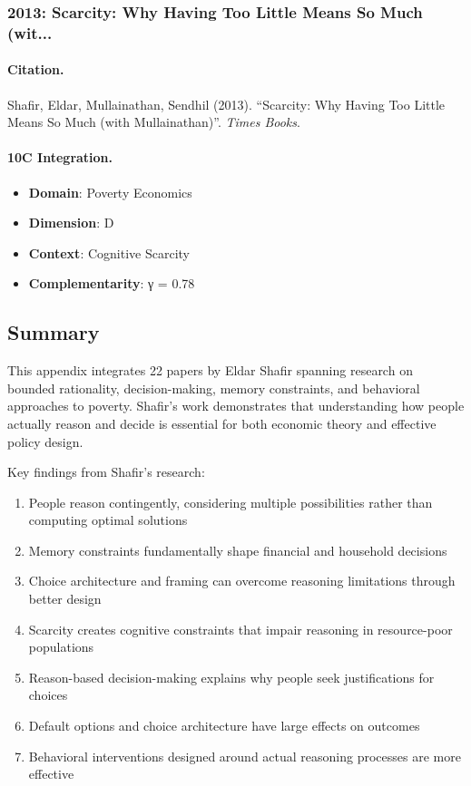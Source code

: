 \subsubsection{2013: Scarcity: Why Having Too Little Means So Much (wit...}

\paragraph{Citation.}
Shafir, Eldar, Mullainathan, Sendhil (2013). ``Scarcity: Why Having Too Little Means So Much (with Mullainathan)''. \textit{Times Books}.

\paragraph{10C Integration.}
\begin{itemize}[nosep]
  \item \textbf{Domain}: Poverty Economics
  \item \textbf{Dimension}: D
  \item \textbf{Context}: Cognitive Scarcity
  \item \textbf{Complementarity}: γ = 0.78
\end{itemize}


\subsection{Summary}

This appendix integrates 22 papers by Eldar Shafir spanning research on bounded rationality, decision-making, memory constraints, and behavioral approaches to poverty. Shafir's work demonstrates that understanding how people actually reason and decide is essential for both economic theory and effective policy design.

Key findings from Shafir's research:

\begin{enumerate}
  \item People reason contingently, considering multiple possibilities rather than computing optimal solutions
  \item Memory constraints fundamentally shape financial and household decisions
  \item Choice architecture and framing can overcome reasoning limitations through better design
  \item Scarcity creates cognitive constraints that impair reasoning in resource-poor populations
  \item Reason-based decision-making explains why people seek justifications for choices
  \item Default options and choice architecture have large effects on outcomes
  \item Behavioral interventions designed around actual reasoning processes are more effective
\end{enumerate}

